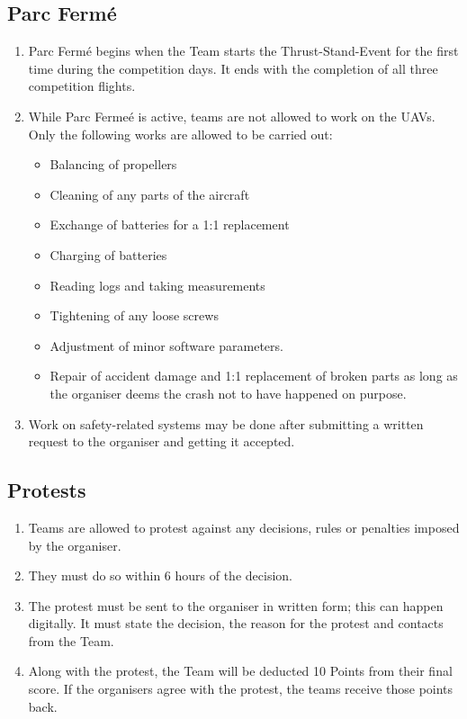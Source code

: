     \subsection{Parc Fermé}
    \begin{enumerate}
      \item Parc Fermé begins when the Team starts the Thrust-Stand-Event for the first time during the competition days. It ends with the completion of all three competition flights. 
      \item While Parc Fermeé is active, teams are not allowed to work on the UAVs. Only the following works are allowed to be carried out: 
      \begin{itemize}
        \item Balancing of propellers
        \item Cleaning of any parts of the aircraft
        \item Exchange of batteries for a 1:1 replacement
        \item Charging of batteries 
        \item Reading logs and taking measurements
        \item Tightening of any loose screws
        \item Adjustment of minor software parameters. 
        \item Repair of accident damage and 1:1 replacement of broken parts as long as the organiser deems the crash not to have happened on purpose. 
      \end{itemize}
      \item Work on safety-related systems may be done after submitting a written request to the organiser and getting it accepted. 
    \end{enumerate}

    \subsection{Protests}
    \begin{enumerate}
      \item Teams are allowed to protest against any decisions, rules or penalties imposed by the organiser.
      \item They must do so within 6 hours of the decision. 
      \item The protest must be sent to the organiser in written form; this can happen digitally. It must state the decision, the reason for the protest and contacts from the Team.
      \item Along with the protest, the Team will be deducted 10 Points from their final score. If the organisers agree with the protest, the teams receive those points back. 
    \end{enumerate}

